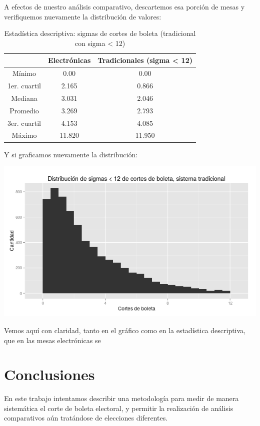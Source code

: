 \documentclass[12pt,a4paper]{article}
\begin{document}
A efectos de nuestro análisis comparativo, descartemos esa porción de mesas y
verifiquemos nuevamente la distribución de valores:

\begin{table}[h!]
\centering
\label{my-label}
\begin{tabular}{c c c}
 & Electrónicas & Tradicionales (sigma < 12) \\
\hline
Mínimo & 0.00 & 0.00 \\
1er. cuartil & 2.165 & 0.866 \\
Mediana & 3.031 & 2.046 \\
Promedio & 3.269 & 2.793 \\
3er. cuartil & 4.153 & 4.085 \\
Máximo & 11.820 & 11.950 \\
\hline
\end{tabular}
\caption{Estadística descriptiva: sigmas de cortes de boleta (tradicional con
  sigma < 12)}
\label{table:1}
\end{table}

Y si graficamos nuevamente la distribución:

\includegraphics[width=\textwidth]{sigmas_tradicional_menor_a_12}

Vemos aquí con claridad, tanto en el gráfico como en la estadística descriptiva,
que en las mesas electrónicas se 

\section{Conclusiones}
En este trabajo intentamos describir una metodología para medir de manera
sistemática el corte de boleta electoral, y permitir la realización de análisis
comparativos aún tratándose de elecciones diferentes.
\end{document}
